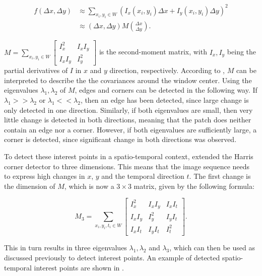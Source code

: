 \begin{equation}
    \begin{split}
        f(\Delta x, \Delta y) 
        &\approx \sum_{x_i, y_i \in W} (I_x(x_i, y_i) \Delta x + I_y(x_i, y_i) \Delta y)^2 \\
        &\approx (\Delta x, \Delta y) M \binom{\Delta x}{\Delta y}.
    \end{split}
\end{equation}

$
M = \sum_{x_i, y_i \in W} 
\begin{bmatrix}
    I_x^2 & I_x I_y \\
    I_x I_y & I_y^2
\end{bmatrix}
$ is the second-moment matrix, with $I_x, I_y$ being the partial derivatives of $I$ in $x$ and $y$ direction, respectively.
According to \cite{laptev_harris3d}, $M$ can be interpreted to describe the the covariances around the window center.
Using the eigenvalues $\lambda_1, \lambda_2$ of $M$, edges and corners can be detected in the following way.
If $\lambda_1 >>\lambda_2$ or $\lambda_1 << \lambda_2$, then an edge has been detected, since large change is only detected in one direction.
Similarly, if both eigenvalues are small, then very little change is detected in both directions, meaning that the patch does neither contain an edge nor a corner.
However, if both eigenvalues are sufficiently large, a corner is detected, since significant change in both directions was observed.

To detect these interest points in a spatio-temporal context, \cite{laptev_harris3d} extended the Harris corner detector to three dimensions.
This means that the image sequence needs to express high changes in $x$, $y$ and the temporal direction $t$.
The first change is the dimension of $M$, which is now a $3 \times 3$ matrix, given by the following formula:

\begin{equation}
    M_3 = \sum_{x_i, y_i, t_i \in W} 
    \begin{bmatrix}
        I_x^2 & I_x I_y & I_x I_t \\
        I_x I_y & I_y^2 & I_y I_t \\
        I_x I_t & I_y I_t & I_t^2
    \end{bmatrix}.
\end{equation}

This in turn results in three eigenvalues $\lambda_1, \lambda_2$ and $\lambda_3$, which can then be used as discussed previously to detect interest points.
An example of detected spatio-temporal interest points are shown in .

